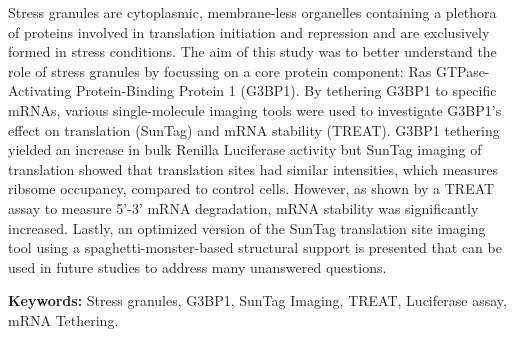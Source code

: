 Stress granules are cytoplasmic, membrane-less organelles containing a plethora of proteins involved in translation initiation and repression and are exclusively formed in stress conditions.
The aim of this study was to better understand the role of stress granules by focussing on a core protein component: Ras GTPase-Activating Protein-Binding Protein 1 (G3BP1).
By tethering G3BP1 to specific mRNAs, various single-molecule imaging tools were used to investigate G3BP1's effect on translation (SunTag) and mRNA stability (TREAT).
G3BP1 tethering yielded an increase in bulk Renilla Luciferase activity but SunTag imaging of translation showed that translation sites had similar intensities, which measures ribsome occupancy, compared to control cells.
However, as shown by a TREAT assay to measure 5'-3' mRNA degradation, mRNA stability was significantly increased.
Lastly, an optimized version of the SunTag translation site imaging tool using a spaghetti-monster-based structural support is presented that can be used in future studies to address many unanswered questions.

\noindent
\textbf{Keywords:}
Stress granules, G3BP1, SunTag Imaging, TREAT, Luciferase assay, mRNA Tethering.

